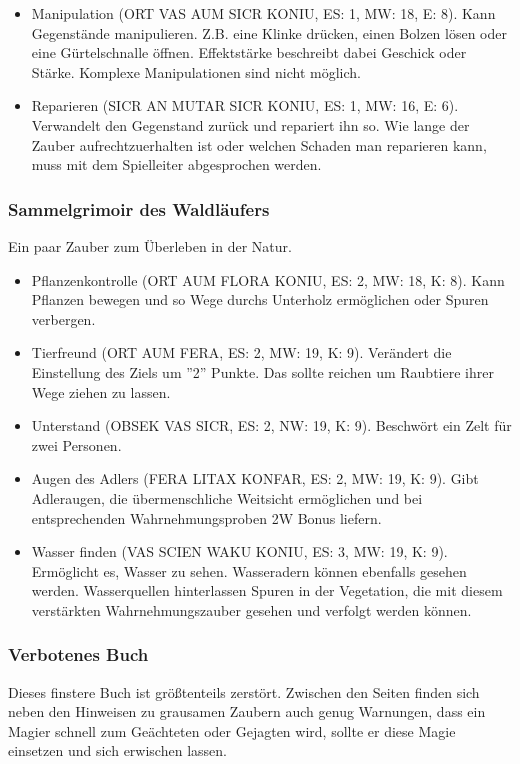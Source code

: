\documentclass{article}
\begin{document}
\begin{itemize}
\item Manipulation (ORT VAS AUM SICR KONIU, ES: 1, MW: 18, E: 8). Kann Gegenstände manipulieren. Z.B. eine Klinke drücken, einen Bolzen lösen oder eine Gürtelschnalle öffnen. Effektstärke beschreibt dabei Geschick oder Stärke. Komplexe Manipulationen sind nicht möglich.
\item Reparieren (SICR AN MUTAR SICR KONIU, ES: 1, MW: 16, E: 6). Verwandelt den Gegenstand zurück und repariert ihn so. Wie lange der Zauber aufrechtzuerhalten ist oder welchen Schaden man reparieren kann, muss mit dem Spielleiter abgesprochen werden.
\end{itemize}

\subsubsection{Sammelgrimoir des Waldläufers}

Ein paar Zauber zum Überleben in der Natur.

\begin{itemize}
\item Pflanzenkontrolle (ORT AUM FLORA KONIU, ES: 2, MW: 18, K: 8). Kann Pflanzen bewegen und so Wege durchs Unterholz ermöglichen oder Spuren verbergen.
\item Tierfreund (ORT AUM FERA, ES: 2, MW: 19, K: 9). Verändert die Einstellung des Ziels um ''2'' Punkte. Das sollte reichen um Raubtiere ihrer Wege ziehen zu lassen.
\item Unterstand (OBSEK VAS SICR, ES: 2, NW: 19, K: 9). Beschwört ein Zelt für zwei Personen.
\item Augen des Adlers (FERA LITAX KONFAR, ES: 2, MW: 19, K: 9). Gibt Adleraugen, die übermenschliche Weitsicht ermöglichen und bei entsprechenden Wahrnehmungsproben 2W Bonus liefern.
\item Wasser finden (VAS SCIEN WAKU KONIU, ES: 3, MW: 19, K: 9). Ermöglicht es, Wasser zu sehen. Wasseradern können ebenfalls gesehen werden. Wasserquellen hinterlassen Spuren in der Vegetation, die mit diesem verstärkten Wahrnehmungszauber gesehen und verfolgt werden können.
\end{itemize}

\subsubsection{Verbotenes Buch}

Dieses finstere Buch ist größtenteils zerstört. Zwischen den Seiten finden sich neben den Hinweisen zu grausamen
Zaubern auch genug Warnungen, dass ein Magier schnell zum Geächteten oder Gejagten wird, sollte er diese Magie
einsetzen und sich erwischen lassen.
\end{document}

